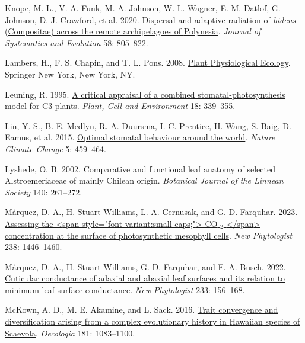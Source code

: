 \documentclass[
  letterpaper,
  DIV=11,
  numbers=noendperiod]{scrartcl}
\newlength{\cslhangindent}
\newlength{\cslentryspacingunit} %
\newenvironment{CSLReferences}[2] %
 {%
  \setlength{\parindent}{0pt}
  \ifodd #1
  \let\oldpar\par
  \def\par{\hangindent=\cslhangindent\oldpar}
  \fi
  \setlength{\parskip}{#2\cslentryspacingunit}
 }%
 {}
\begin{document}
\begin{CSLReferences}{1}{0}
\leavevmode{}%
Knope, M. L., V. A. Funk, M. A. Johnson, W. L. Wagner, E. M. Datlof, G.
Johnson, D. J. Crawford, et al. 2020.
\href{https://doi.org/10.1111/jse.12704}{Dispersal and adaptive
radiation of \emph{bidens} ({Compositae}) across the remote
archipelagoes of {Polynesia}}. \emph{Journal of Systematics and
Evolution} 58: 805--822.

\leavevmode{}%
Lambers, H., F. S. Chapin, and T. L. Pons. 2008.
\href{https://doi.org/10.1007/978-0-387-78341-3}{Plant {Physiological}
{Ecology}}. Springer New York, New York, NY.

\leavevmode{}%
Leuning, R. 1995.
\href{https://doi.org/10.1111/j.1365-3040.1995.tb00370.x}{A critical
appraisal of a combined stomatal-photosynthesis model for {C3} plants}.
\emph{Plant, Cell and Environment} 18: 339--355.

\leavevmode{}%
Lin, Y.-S., B. E. Medlyn, R. A. Duursma, I. C. Prentice, H. Wang, S.
Baig, D. Eamus, et al. 2015.
\href{https://doi.org/10.1038/nclimate2550}{Optimal stomatal behaviour
around the world}. \emph{Nature Climate Change} 5: 459--464.

\leavevmode{}%
Lyshede, O. B. 2002. Comparative and functional leaf anatomy of selected
{Alstroemeriaceae} of mainly {Chilean} origin. \emph{Botanical Journal
of the Linnean Society} 140: 261--272.

\leavevmode{}%
Márquez, D. A., H. Stuart‐Williams, L. A. Cernusak, and G. D. Farquhar.
2023. \href{https://doi.org/10.1111/nph.18784}{Assessing the
{\textless{}}span style="font-variant:small-caps;"{\textgreater{}} {CO}
\(_{\textrm{2}}\) {\textless{}}/span{\textgreater{}} concentration at
the surface of photosynthetic mesophyll cells}. \emph{New Phytologist}
238: 1446--1460.

\leavevmode{}%
Márquez, D. A., H. Stuart‐Williams, G. D. Farquhar, and F. A. Busch.
2022. \href{https://doi.org/10.1111/nph.17588}{Cuticular conductance of
adaxial and abaxial leaf surfaces and its relation to minimum leaf
surface conductance}. \emph{New Phytologist} 233: 156--168.

\leavevmode{}%
McKown, A. D., M. E. Akamine, and L. Sack. 2016.
\href{https://doi.org/10.1007/s00442-016-3640-3}{Trait convergence and
diversification arising from a complex evolutionary history in
{Hawaiian} species of {Scaevola}}. \emph{Oecologia} 181: 1083--1100.


\end{CSLReferences}
\end{document}
